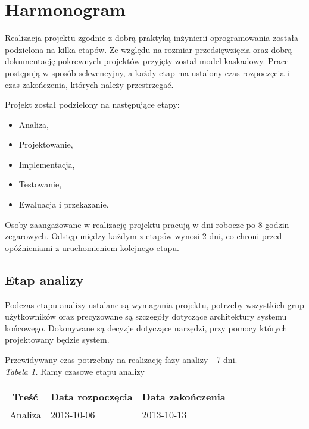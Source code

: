 \documentclass [11pt, a4paper, leqno]	{article}	%
\begin{document}
\section{Harmonogram}
\noindent
Realizacja projektu zgodnie z dobrą praktyką inżynierii oprogramowania została podzielona na kilka etapów. Ze względu na rozmiar przedsięwzięcia oraz dobrą dokumentację pokrewnych projektów przyjęty został model kaskadowy. Prace postępują w sposób sekwencyjny, a każdy etap ma ustalony czas rozpoczęcia i czas zakończenia, których należy przestrzegać.

Projekt został podzielony na następujące etapy:
\begin{itemize}
	\item Analiza,
	\item Projektowanie,
	\item Implementacja,
	\item Testowanie,
	\item Ewaluacja i przekazanie.
\end{itemize}

Osoby zaangażowane w realizację projektu pracują w dni robocze po 8 godzin zegarowych. Odstęp między każdym z etapów wynosi 2 dni, co chroni przed opóźnieniami z uruchomieniem kolejnego etapu.

\subsection{Etap analizy}
\noindent
Podczas etapu analizy ustalane są wymagania projektu, potrzeby wszystkich grup użytkowników oraz precyzowane są szczegóły dotyczące architektury systemu końcowego. Dokonywane są decyzje dotyczące narzędzi, przy pomocy których projektowany będzie system. 

Przewidywany czas potrzebny na realizację fazy analizy - 7 dni. \\


\textit{Tabela 1.} Ramy czasowe etapu analizy

\begin{center}
	\begin{tabular}{| l | l | l |}
		\hline
		\multicolumn{1}{|c|}{Treść} & 
		\multicolumn{1}{|c|}{Data rozpoczęcia} & 
		\multicolumn{1}{|c|}{Data zakończenia} \\ \hline \hline
		Analiza & 2013-10-06 & 2013-10-13 \\ \hline
	\end{tabular}
\end{center}
\end{document}
